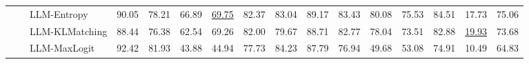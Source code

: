 \begin{table}[ht!]
\begin{tabularx}{\textwidth}{@{}l l l |l *{11}{Y}|Y@{}}
 &  & LLM-Entropy & 90.05 & 78.21 & 66.89 & \underline{69.75} & 82.37 & 83.04 & 89.17 & 83.43 & 80.08 & 75.53 & 84.51 & 17.73 & 75.06 \\
 &  & LLM-KLMatching & 88.44 & 76.38 & 62.54 & 69.26 & 82.00 & 79.67 & 88.71 & 82.77 & 78.04 & 73.51 & 82.88 & \underline{19.93} & 73.68 \\
 &  & LLM-MaxLogit & 92.42 & 81.93 & 43.88 & 44.94 & 77.73 & 84.23 & 87.79 & 76.94 & 49.68 & 53.08 & 74.91 & 10.49 & 64.83 \\
\bottomrule
\end{tabularx}
\label{table::openset_LCR0.5}
\end{table}